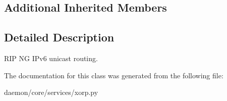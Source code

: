\subsection*{Additional Inherited Members}


\subsection{Detailed Description}
\begin{DoxyVerb}RIP NG IPv6 unicast routing.
\end{DoxyVerb}
 

The documentation for this class was generated from the following file\+:\begin{DoxyCompactItemize}
\item 
daemon/core/services/xorp.\+py\end{DoxyCompactItemize}
